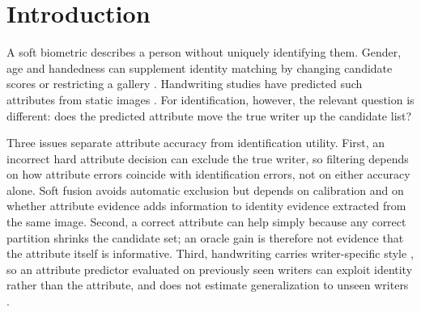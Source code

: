 \section{Introduction}
A soft biometric describes a person without uniquely identifying them. Gender, age and handedness can supplement identity matching by changing candidate scores or restricting a gallery \cite{jain2004soft,jain2004integrating,dantcheva2016soft,nixon2015soft}. Handwriting studies have predicted such attributes from static images \cite{liwicki2011gender,siddiqi2015gender,bouadjenek2016soft,almaadeed2016handedness,morera2018handedness,rahmanian2021handedness}. For identification, however, the relevant question is different: does the predicted attribute move the true writer up the candidate list?

Three issues separate attribute accuracy from identification utility. First, an incorrect hard attribute decision can exclude the true writer, so filtering depends on how attribute errors coincide with identification errors, not on either accuracy alone. Soft fusion avoids automatic exclusion but depends on calibration and on whether attribute evidence adds information to identity evidence extracted from the same image. Second, a correct attribute can help simply because any correct partition shrinks the candidate set; an oracle gain is therefore not evidence that the attribute itself is informative. Third, handwriting carries writer-specific style \cite{bulacu2007text,schomaker2007codebooks}, so an attribute predictor evaluated on previously seen writers can exploit identity rather than the attribute, and does not estimate generalization to unseen writers \cite{kaufman2012leakage}.

